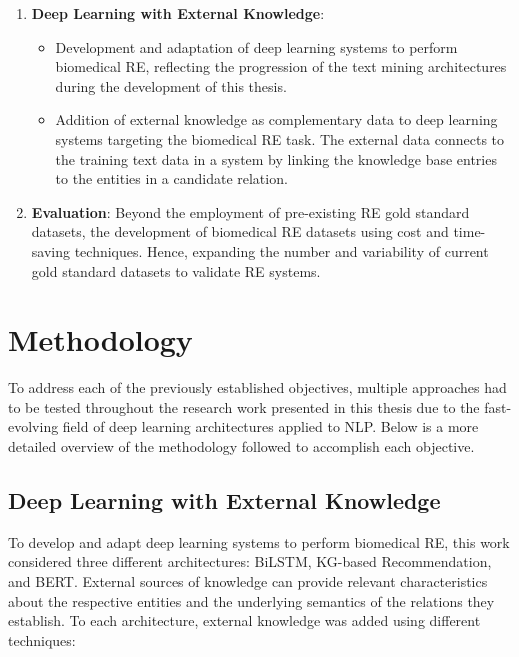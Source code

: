 \begin{enumerate}
\item{\textbf{Deep Learning with External Knowledge}: 
\begin{itemize}
    \item Development and adaptation of deep learning systems to perform biomedical RE, reflecting the progression of the text mining architectures during the development of this thesis.
    \item Addition of external knowledge as complementary data to deep learning systems targeting the biomedical RE task. The external data connects to the training text data in a system by linking the knowledge base entries to the entities in a candidate relation.
\end{itemize}}
\item{\textbf{Evaluation}: Beyond the employment of pre-existing RE gold standard datasets, the development of biomedical RE datasets using cost and time-saving techniques. Hence, expanding the number and variability of current gold standard datasets to validate RE systems.}
\end{enumerate}

\section{Methodology}

To address each of the previously established objectives, multiple approaches had to be tested throughout the research work presented in this thesis due to the fast-evolving field of deep learning architectures applied to \ac{NLP}. Below is a more detailed overview of the methodology followed to accomplish each objective.

\subsection{Deep Learning with External Knowledge}

To develop and adapt deep learning systems to perform biomedical RE, this work considered three different architectures: BiLSTM, \ac{KG}-based Recommendation, and BERT. External sources of knowledge can provide relevant characteristics about the respective entities and the underlying semantics of the relations they establish. To each architecture, external knowledge was added using different techniques:

